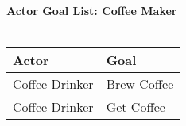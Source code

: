 \documentclass[letterpaper]{article}
\begin{document}
\noindent
\textbf{Actor Goal List:  Coffee Maker}\\\\
\vspace{4ex}
\begin{tabular}{|p{5cm}|p{5cm}|}\hline
\textbf{Actor} & \textbf{Goal}\\\hline
Coffee Drinker & Brew Coffee\\\hline
Coffee Drinker & Get Coffee\\\hline
\end{tabular}
\end{document}
